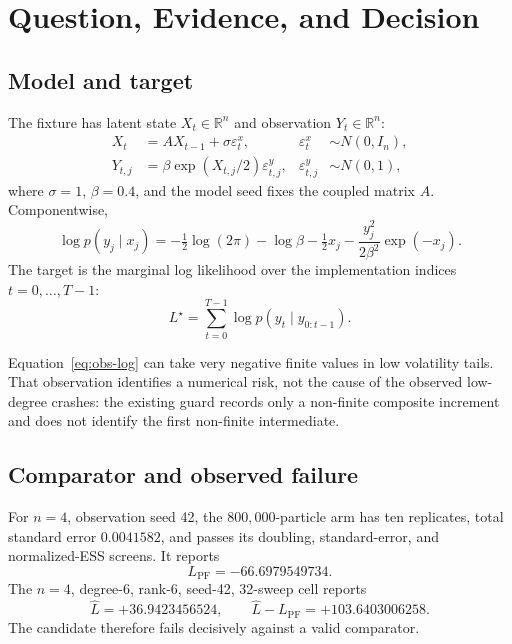 \documentclass[11pt]{article}
\begin{document}
\section{Question, Evidence, and Decision}

\subsection{Model and target}

The fixture has latent state $X_t\in\mathbb{R}^n$ and observation
$Y_t\in\mathbb{R}^n$:
\begin{align}
X_t &= A X_{t-1}+\sigma\varepsilon^x_t,
&\varepsilon^x_t&\sim N(0,I_n),\\
Y_{t,j} &= \beta \exp(X_{t,j}/2)\varepsilon^y_{t,j},
&\varepsilon^y_{t,j}&\sim N(0,1),
\end{align}
where $\sigma=1$, $\beta=0.4$, and the model seed fixes the coupled matrix
$A$. Componentwise,
\begin{equation}\label{eq:obs-log}
\log p(y_j\mid x_j)
=-\tfrac12\log(2\pi)-\log\beta-\tfrac12x_j
  -\frac{y_j^2}{2\beta^2}\exp(-x_j).
\end{equation}
The target is the marginal log likelihood over the implementation indices
$t=0,\ldots,T-1$:
\begin{equation}
L^\star=\sum_{t=0}^{T-1}\log p(y_t\mid y_{0:t-1}).
\end{equation}

Equation~\eqref{eq:obs-log} can take very negative finite values in low
volatility tails. That observation identifies a numerical risk, not the cause
of the observed low-degree crashes: the existing guard records only a
non-finite composite increment and does not identify the first non-finite
intermediate.

\subsection{Comparator and observed failure}

For $n=4$, observation seed 42, the $800{,}000$-particle arm has ten
replicates, total standard error $0.0041582$, and passes its doubling,
standard-error, and normalized-ESS screens. It reports
\begin{equation}
L_{\mathrm{PF}}=-66.6979549734.
\end{equation}
The $n=4$, degree-6, rank-6, seed-42, 32-sweep cell reports
\begin{equation}
\widehat L=+36.9423456524,
\qquad
\widehat L-L_{\mathrm{PF}}=+103.6403006258.
\end{equation}
The candidate therefore fails decisively against a valid comparator.
\end{document}
